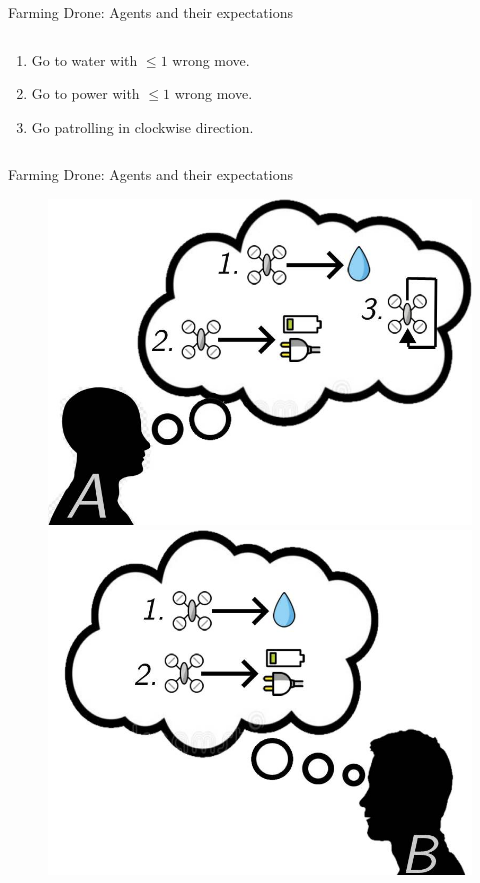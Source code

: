 \documentclass[usenames,dvipsnames]{beamer}
\begin{document}
\begin{frame}{Farming Drone: Agents and their expectations}
\begin{columns}
\begin{column}{.5\textwidth}
    \begin{enumerate}
        \item Go to water with $\leq 1$ wrong move.
        \item Go to power with $\leq 1$ wrong move.
        \item Go patrolling in clockwise direction.
    \end{enumerate}
    \end{column}
    \begin{column}{.5\textwidth}
        
    \end{column}
    \end{columns}
\end{frame}

\begin{frame}{Farming Drone: Agents and their expectations}
    \begin{figure}
        \centering
        \includegraphics[scale=0.2]{images/a-expects-patrol.jpg}
        \includegraphics[scale=0.2]{images/b-expects-move.jpg}

\end{figure}
\end{frame}
\end{document}
